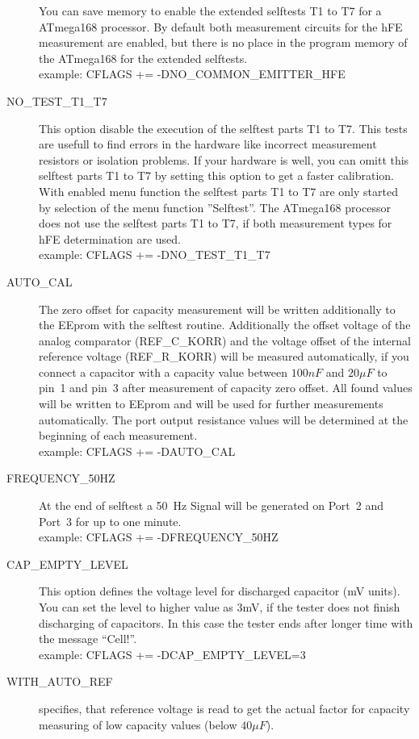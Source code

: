 \begin{description}
You can save memory to enable the extended selftests T1 to T7 for a ATmega168 processor.
By default both measurement circuits for the hFE measurement are enabled, 
but there is no place in the program memory of the ATmega168 for the extended selftests.\\
example: CFLAGS += -DNO\_COMMON\_EMITTER\_HFE
  \item[NO\_TEST\_T1\_T7] This option disable the execution of the selftest parts T1 to T7.
This tests are usefull to find errors in the hardware like incorrect measurement resistors or isolation problems.
If your hardware is well, you can omitt this selftest parts T1 to T7 by setting this option to get a faster calibration.
With enabled menu function the selftest parts T1 to T7 are only started by selection of the menu function ''Selftest''.
The ATmega168 processor does not use the selftest parts T1 to T7, if both measurement types for hFE determination are used.\\
example: CFLAGS += -DNO\_TEST\_T1\_T7
  \item[AUTO\_CAL] The zero offset for capacity measurement will be written additionally
to the EEprom with the selftest routine. Additionally the offset voltage of the analog comparator (REF\_C\_KORR) and the
voltage offset of the internal reference voltage (REF\_R\_KORR) will be measured automatically, if you connect a
capacitor with a capacity value between \(100 nF\) and \(20 \mu F\) to pin~1 and pin~3 after measurement of capacity zero offset. 
All found values will be written to EEprom and will be used for further measurements automatically.
The port output resistance values will be determined at the beginning of each measurement.\\
example: CFLAGS += -DAUTO\_CAL
  \item[FREQUENCY\_50HZ] At the end of selftest a 50~Hz Signal will be generated on Port~2 and Port~3 for up to one minute.\\
example: CFLAGS += -DFREQUENCY\_50HZ
  \item[CAP\_EMPTY\_LEVEL]  This option defines the voltage level for discharged capacitor (mV units).
You can set the level to higher value as 3mV, if the tester does not finish discharging of capacitors.
In this case the tester ends after longer time with the message ``Cell!''.\\
example: CFLAGS += -DCAP\_EMPTY\_LEVEL=3
  \item[WITH\_AUTO\_REF] specifies, that reference voltage is read to get the actual factor for capacity measuring of low capacity values (below \(40\mu F\)).\\

\end{description}
